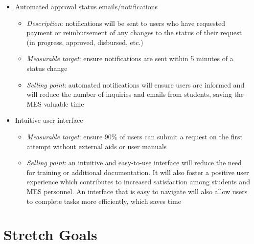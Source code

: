 \documentclass{article}
\begin{document}
\begin{itemize}
    \item Automated approval status emails/notifications
    \begin{itemize}
        \item \emph{Description}: notifications will be sent to users who have requested payment or reimbursement of any changes to the status of their request (in progress, approved, disbursed, etc.)
        \item \emph{Measurable target}: ensure notifications are sent within 5 minutes of a status change
        \item \emph{Selling point}: automated notifications will ensure users are informed and will reduce the number of inquiries and emails from students, saving the MES valuable time
    \end{itemize}
    \item Intuitive user interface
    \begin{itemize}
        \item \emph{Measurable target}: ensure 90\% of users can submit a request on the first attempt without external aids or user manuals
        \item \emph{Selling point}: an intuitive and easy-to-use interface will reduce the need for training or additional documentation. It will also foster a positive user experience which contributes to increased satisfaction among students and MES personnel. An interface that is easy to navigate will also allow users to complete tasks more efficiently, which saves time
    \end{itemize}
\end{itemize}

\section{Stretch Goals}
\end{document}
